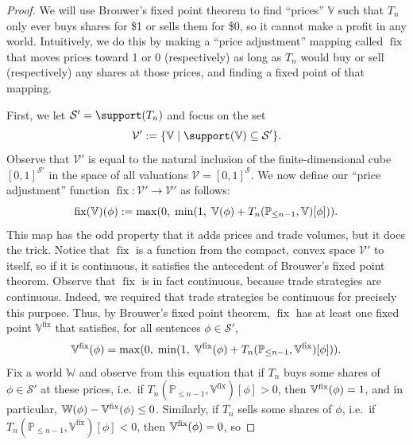 \documentclass[authordate,onecolumn,noenvironments]{miri-tech-article}
\numberwithin{equation}{subsection}
\newcommand{\nn}{n}
\newcommand{\trade}{T}%
\newcommand{\append}{,}
\newcommand{\adj}{{{\operatorname{fix}}}}
\newcommand{\Valuations}{\mathcal{V}}
\newcommand{\BelState}{\mathbb{P}}
\newcommand{\Valuation}{\mathbb{V}}
\newcommand{\pt}{\BelState}
\newcommand{\World}{\mathbb{W}}
\newcommand{\Sentences}{\mathcal{S}}
\begin{document}
\begin{proof}
We will use Brouwer's fixed point theorem to find ``prices'' $\Valuation$ such that $\trade_\nn$ only ever buys shares for \$1 or sells them for \$0, so it cannot make a profit in any world. Intuitively, we do this by making a ``price adjustment'' mapping called $\adj$ that moves prices toward 1 or 0 (respectively) as long as $\trade_\nn$ would buy or sell (respectively) any shares at those prices, and finding a fixed point of that mapping.

First, we let $\Sentences' = \support(\trade_\nn)$ and focus on the set
\begin{equation*}
\Valuations' := \{ \Valuation \mid \support(\Valuation)\subseteq \Sentences'\}.
\end{equation*}
%
Observe that $\Valuations'$ is equal to the natural inclusion of the 
finite-dimensional cube $[0,1]^{\Sentences'}$ in the space of all 
valuations $\Valuations = [0,1]^{\Sentences}$.  We now define our ``price adjustment'' function $\adj:\Valuations'\to\Valuations'$ as follows:
%
\begin{equation*}
 \adj(\Valuation)(\phi):=
   \max\mleft(0,\; \min\mleft(
     1, \; \Valuation(\phi)+ \trade_\nn (\pt_{\le \nn-1}\append\Valuation)[\phi]
   \mright)
 \mright).
\end{equation*}
%
This map has the odd property that it adds prices and trade volumes, but it does the trick. Notice that $\adj$ is a function from the compact, convex space $\Valuations'$ to itself, so if it is continuous, it satisfies the antecedent of Brouwer's fixed point theorem. Observe that $\adj$ is in fact continuous, because trade strategies are continuous. Indeed, we required that trade strategies be continuous for precisely this purpose. Thus, by Brouwer's fixed point theorem, $\adj$ has at least one fixed point $\Valuation^\adj$ that satisfies, for all sentences $\phi\in\Sentences'$,
%
\begin{equation*}
\Valuation^\adj\-(\phi) = \max(0, \; \min( 1, \; \Valuation^\adj\-(\phi) + \trade_\nn (\pt_{\le \nn-1}\append\Valuation^\adj)[\phi]) ).
\end{equation*}
%
Fix a world $\World$ and observe from this equation that if $\trade_\nn$ buys some shares of $\phi\in\Sentences'$ at these prices, i.e.\ if $\trade_\nn(\pt_{\le \nn-1}\append\Valuation^\adj)[\phi]>0$, then $\Valuation^\adj\-(\phi)=1$, and in particular, 
$\World(\phi) - \Valuation^\adj\-(\phi)\leq 0$.  Similarly, if $\trade_\nn$ sells some shares of $\phi$, i.e.\ if $\trade_\nn(\pt_{\le \nn-1}\append\Valuation^\adj)[\phi]<0$, then $\Valuation^\adj\-(\phi)=0$, so 

\end{proof}
\end{document}
